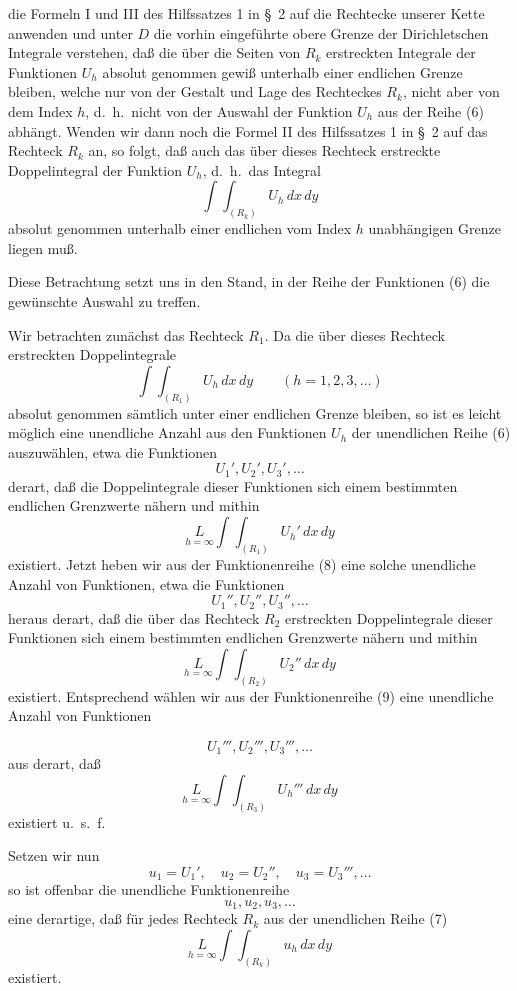 \documentclass{article}
\begin{document}
die Formeln I und III des Hilfssatzes 1 in §~2 auf die Rechtecke unserer Kette anwenden und unter $D$ die vorhin eingeführte obere Grenze der Dirichletschen Integrale verstehen, daß die über die Seiten von $R_k$ erstreckten Integrale der Funktionen $U_h$ absolut genommen gewiß unterhalb einer endlichen Grenze bleiben, welche nur von der Gestalt und Lage des Rechteckes $R_k$, nicht aber von dem Index $h$, d.~h.\ nicht von der Auswahl der Funktion $U_h$ aus der Reihe (6) abhängt. Wenden wir dann noch die Formel II des Hilfssatzes 1 in §~2 auf das Rechteck $R_k$ an, so folgt, daß auch das über dieses Rechteck erstreckte Doppelintegral der Funktion $U_h$, d.~h.\ das Integral
\[
\int\!\!\int_{(R_k)} U_h\,dx\,dy
\]
absolut genommen unterhalb einer endlichen vom Index $h$ unabhängigen Grenze liegen muß.

Diese Betrachtung setzt uns in den Stand, in der Reihe der Funktionen (6) die gewünschte Auswahl zu treffen.

Wir betrachten zunächst das Rechteck $R_1$. Da die über dieses Rechteck erstreckten Doppelintegrale
\[
\int\!\!\int_{(R_1)} U_h\,dx\,dy \qquad (h = 1, 2, 3, \dots)
\]
absolut genommen sämtlich unter einer endlichen Grenze bleiben, so ist es leicht möglich eine unendliche Anzahl aus den Funktionen $U_h$ der unendlichen Reihe (6) auszuwählen, etwa die Funktionen
\[
U_1', U_2', U_3', \dots \tag{8}
\]
derart, daß die Doppelintegrale dieser Funktionen sich einem bestimmten endlichen Grenzwerte nähern und mithin
\[
\underset{h=\infty}{L} \int\!\!\int_{(R_1)} U_h'\,dx\,dy
\]
existiert. Jetzt heben wir aus der Funktionenreihe (8) eine solche unendliche Anzahl von Funktionen, etwa die Funktionen
\[
U_1'', U_2'', U_3'', \dots \tag{9}
\]
heraus derart, daß die über das Rechteck $R_2$ erstreckten Doppelintegrale dieser Funktionen sich einem bestimmten endlichen Grenzwerte nähern und mithin
\[
\underset{h=\infty}{L} \int\!\!\int_{(R_2)} U_2''\,dx\,dy
\]
existiert. Entsprechend wählen wir aus der Funktionenreihe (9) eine unendliche Anzahl von Funktionen

\[
U_1''', U_2''', U_3''', \dots
\]
aus derart, daß
\[
\underset{h=\infty}{L} \int\!\!\int_{(R_3)} U_h'''\,dx\,dy
\]
existiert u.~s.~f.

Setzen wir nun
\[
u_1 = U_1', \quad u_2 = U_2'', \quad u_3 = U_3''', \dots
\]
so ist offenbar die unendliche Funktionenreihe
\[
u_1, u_2, u_3, \dots \tag{10}
\]
eine derartige, daß für jedes Rechteck $R_k$ aus der unendlichen Reihe (7)
\[
\underset{h=\infty}{L} \int\!\!\int_{(R_k)} u_h\,dx\,dy
\]
existiert.
\end{document}
